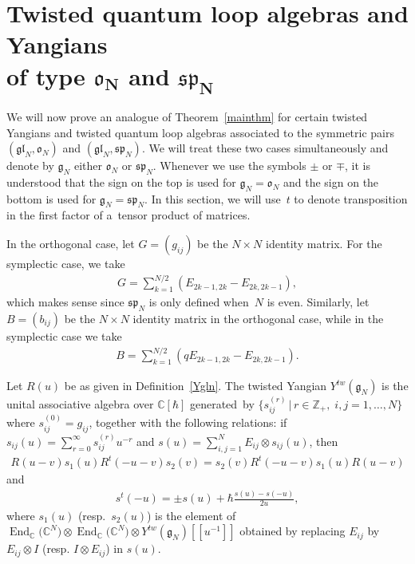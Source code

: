 \documentclass[11pt]{article}
\numberwithin{theorem}{section}
\numberwithin{proposition}{section}
\numberwithin{lemma}{section}
\numberwithin{corollary}{section}
\numberwithin{definition}{section}
\numberwithin{example}{section}
\numberwithin{remark}{section}
\numberwithin{note}{section}
\DeclareMathOperator{\End}{End}
\numberwithin{equation}{section}
\begin{document}
\section[Twisted quantum loop algebras and Yangians of type $\mathfrak{o}_N$ and $\mathfrak{sp}_N$]{Twisted quantum loop algebras and Yangians\\ of type $\boldsymbol{\mathfrak{o}_N}$ and $\boldsymbol{\mathfrak{sp}_N}$}
\label{twsec}
We will now prove an analogue of Theorem~\ref{mainthm} for certain twisted Yangians and twisted quantum loop algebras
associated to the symmetric pairs $(\mathfrak{gl}_N,\mathfrak{o}_N)$ and
$(\mathfrak{gl}_N,\mathfrak{sp}_N)$.
We will treat these two cases simultaneously and denote by $\mathfrak{g}_N$ either $\mathfrak{o}_N$ or
$\mathfrak{sp}_N$.
Whenever we use the symbols $\pm$ or $\mp$, it is understood that the sign on the top is used for
$\mathfrak{g}_N=\mathfrak{o}_N$ and the sign on the bottom is used for $\mathfrak{g}_N=\mathfrak{sp}_N$.
In this section, we will use~$t$ to denote transposition in the f\/irst factor of a~tensor product of matrices.

In the orthogonal case, let $G=(g_{ij})$ be the $N \times N$ identity matrix.
For the symplectic case, we take
\begin{gather*}
G=\sum\limits_{k=1}^{N/2} (E_{2k-1,2k}-E_{2k,2k-1}),
\end{gather*}
which makes sense since $\mathfrak{sp}_N$ is only def\/ined when~$N$ is even.
Similarly, let $B=(b_{ij})$ be the $N \times N$ identity matrix in the orthogonal case, while in the symplectic case we
take
\begin{gather*}
B=\sum\limits_{k=1}^{N/2} (qE_{2k-1,2k}-E_{2k,2k-1}).
\end{gather*}

\begin{definition}
\label{Ytw}
Let $R(u)$ be as given in Def\/inition~\ref{Ygln}.
The twisted Yangian $Y^{tw}(\mathfrak{g}_N)$ is the unital associative algebra over $\mathbb{C}[\hbar]$ generated~by
$\big\{s_{ij}^{(r)} \,|\, r\in\mathbb{Z}_+,\; i,j=1,\ldots,N\big\}$ where $s_{ij}^{(0)}=g_{ij}$, together with the following
relations: if $s_{ij}(u)=\sum\limits_{r=0}^\infty s_{ij}^{(r)}u^{-r}$ and $s(u)=\sum\limits_{i,j=1}^N E_{ij} \otimes
s_{ij}(u)$, then
\begin{gather*}
R(u-v)s_1(u)R^t(-u-v)s_2(v)=s_2(v)R^t(-u-v)s_1(u)R(u-v)
\end{gather*}
and
\begin{gather*}
s^t(-u)= \pm s(u) + \hbar\frac{s(u)-s(-u)}{2u},
\end{gather*}
where $s_1(u)$ (resp.\
$s_2(u)$) is the element of $\End_{\mathbb{C}}\big(\mathbb{C}^N\big) \otimes \End_{\mathbb{C}}\big(\mathbb{C}^N\big) \otimes
Y^{tw}(\mathfrak{g}_N)[[u^{-1}]]$ obtained by replacing $E_{ij}$ by $E_{ij} \otimes I$ (resp.
$I \otimes E_{ij}$) in $s(u)$.
\end{definition}
\end{document}
